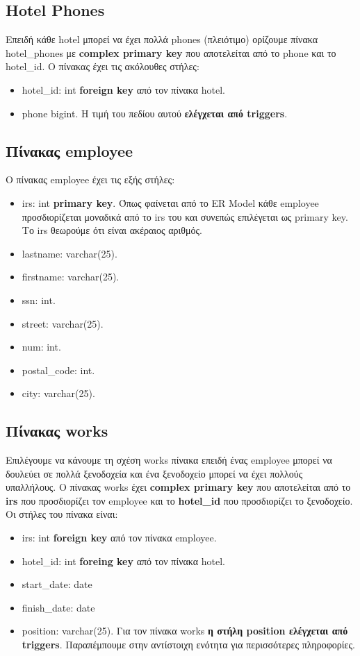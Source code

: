\documentclass[a4paper,oneside, 11pt]{article}
\begin{document}
\subsection{Hotel Phones}
Επειδή κάθε hotel μπορεί να έχει πολλά phones (πλειότιμο) ορίζουμε πίνακα hotel\_phones με \textbf{complex primary key} που αποτελείται από το phone και το hotel\_id. Ο πίνακας έχει τις ακόλουθες στήλες:
\begin{itemize}
\item hotel\_id: int \textbf{foreign key} από τον πίνακα hotel.
\item phone bigint. Η τιμή του πεδίου αυτού \textbf{ελέγχεται από triggers}.
\end{itemize}


\subsection{Πίνακας employee}
Ο πίνακας employee έχει τις εξής στήλες:
\begin{itemize}
\item irs: int \textbf{primary key}. Όπως φαίνεται από το ER Model κάθε employee προσδιορίζεται μοναδικά από το irs του και συνεπώς επιλέγεται ως primary key. Το irs θεωρούμε ότι είναι ακέραιος αριθμός. 
\item lastname: varchar(25).
\item firstname: varchar(25).
\item ssn: int.
\item street: varchar(25).
\item num: int.
\item postal\_code: int.
\item city: varchar(25).
\end{itemize}

\subsection{Πίνακας works}
Επιλέγουμε να κάνουμε τη σχέση works πίνακα επειδή ένας employee μπορεί να δουλεύει σε πολλά ξενοδοχεία και ένα ξενοδοχείο μπορεί να έχει πολλούς υπαλλήλους. Ο πίνακας works έχει \textbf{complex primary key} που αποτελείται από το \textbf{irs} που προσδιορίζει τον employee και το \textbf{hotel\_id} που προσδιορίζει το ξενοδοχείο.
Οι στήλες του πίνακα είναι:
\begin{itemize}
\item irs: int \textbf{foreign key} από τον πίνακα employee.
\item hotel\_id: int \textbf{foreing key} από τον πίνακα hotel.
\item start\_date: date
\item finish\_date: date
\item position: varchar(25). Για τον πίνακα works \textbf{η στήλη position ελέγχεται από triggers}. Παραπέμπουμε στην αντίστοιχη ενότητα για περισσότερες πληροφορίες.
\end{itemize}
\end{document}
